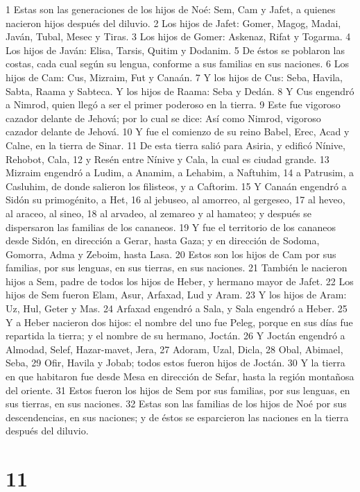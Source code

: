 1 Estas son las generaciones de los hijos de Noé: Sem, Cam y Jafet, a quienes nacieron hijos después del diluvio.
2 Los hijos de Jafet: Gomer, Magog, Madai, Javán, Tubal, Mesec y Tiras.
3 Los hijos de Gomer: Askenaz, Rifat y Togarma.
4 Los hijos de Javán: Elisa, Tarsis, Quitim y Dodanim.
5 De éstos se poblaron las costas, cada cual según su lengua, conforme a sus familias en sus naciones.
6 Los hijos de Cam: Cus, Mizraim, Fut y Canaán.
7 Y los hijos de Cus: Seba, Havila, Sabta, Raama y Sabteca. Y los hijos de Raama: Seba y Dedán.
8 Y Cus engendró a Nimrod, quien llegó a ser el primer poderoso en la tierra.
9 Este fue vigoroso cazador delante de Jehová; por lo cual se dice: Así como Nimrod, vigoroso cazador delante de Jehová.
10 Y fue el comienzo de su reino Babel, Erec, Acad y Calne, en la tierra de Sinar.
11 De esta tierra salió para Asiria, y edificó Nínive, Rehobot, Cala,
12 y Resén entre Nínive y Cala, la cual es ciudad grande.
13 Mizraim engendró a Ludim, a Anamim, a Lehabim, a Naftuhim,
14 a Patrusim, a Casluhim, de donde salieron los filisteos, y a Caftorim.
15 Y Canaán engendró a Sidón su primogénito, a Het,
16 al jebuseo, al amorreo, al gergeseo,
17 al heveo, al araceo, al sineo,
18 al arvadeo, al zemareo y al hamateo; y después se dispersaron las familias de los cananeos.
19 Y fue el territorio de los cananeos desde Sidón, en dirección a Gerar, hasta Gaza; y en dirección de Sodoma, Gomorra, Adma y Zeboim, hasta Lasa.
20 Estos son los hijos de Cam por sus familias, por sus lenguas, en sus tierras, en sus naciones.
21 También le nacieron hijos a Sem, padre de todos los hijos de Heber, y hermano mayor de Jafet.
22 Los hijos de Sem fueron Elam, Asur, Arfaxad, Lud y Aram.
23 Y los hijos de Aram: Uz, Hul, Geter y Mas.
24 Arfaxad engendró a Sala, y Sala engendró a Heber.
25 Y a Heber nacieron dos hijos: el nombre del uno fue Peleg, porque en sus días fue repartida la tierra; y el nombre de su hermano, Joctán.
26 Y Joctán engendró a Almodad, Selef, Hazar-mavet, Jera,
27 Adoram, Uzal, Dicla,
28 Obal, Abimael, Seba,
29 Ofir, Havila y Jobab; todos estos fueron hijos de Joctán.
30 Y la tierra en que habitaron fue desde Mesa en dirección de Sefar, hasta la región montañosa del oriente.
31 Estos fueron los hijos de Sem por sus familias, por sus lenguas, en sus tierras, en sus naciones.
32 Estas son las familias de los hijos de Noé por sus descendencias, en sus naciones; y de éstos se esparcieron las naciones en la tierra después del diluvio.

\chapter{11}


